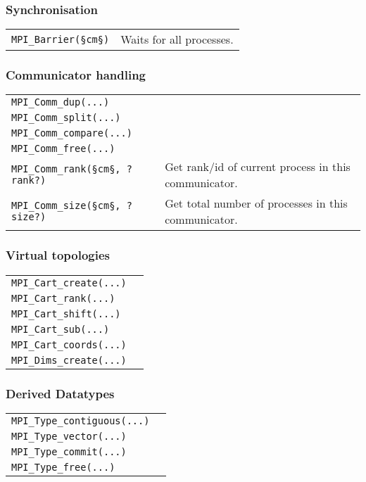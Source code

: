 \documentclass[11pt]{article}
\begin{document}
\subsubsection{Synchronisation}
\begin{tabular}{ p{8cm} l }
	\lstinline$MPI_Barrier(§cm§)$ & Waits for all processes. \\
\end{tabular}

\subsubsection{Communicator handling}
\begin{tabular}{ p{8cm} l }
	\lstinline$MPI_Comm_dup(...)$ & \\
	\lstinline$MPI_Comm_split(...)$ & \\
	\lstinline$MPI_Comm_compare(...)$ & \\
	\lstinline$MPI_Comm_free(...)$ & \\
	\lstinline$MPI_Comm_rank(§cm§, ?rank?)$ & Get rank/id of current process in this communicator. \\
	\lstinline$MPI_Comm_size(§cm§, ?size?)$ & Get total number of processes in this communicator. \\
\end{tabular}

\subsubsection{Virtual topologies}
\begin{tabular}{ p{8cm} l }
	\lstinline$MPI_Cart_create(...)$ & \\
	\lstinline$MPI_Cart_rank(...)$ & \\
	\lstinline$MPI_Cart_shift(...)$ & \\
	\lstinline$MPI_Cart_sub(...)$ & \\
	\lstinline$MPI_Cart_coords(...)$ & \\
	\lstinline$MPI_Dims_create(...)$ & \\
\end{tabular}

\subsubsection{Derived Datatypes}
\begin{tabular}{ p{8cm} l }
	\lstinline$MPI_Type_contiguous(...)$ & \\
	\lstinline$MPI_Type_vector(...)$ & \\
	\lstinline$MPI_Type_commit(...)$ & \\
	\lstinline$MPI_Type_free(...)$ & \\
\end{tabular}
\end{document}
